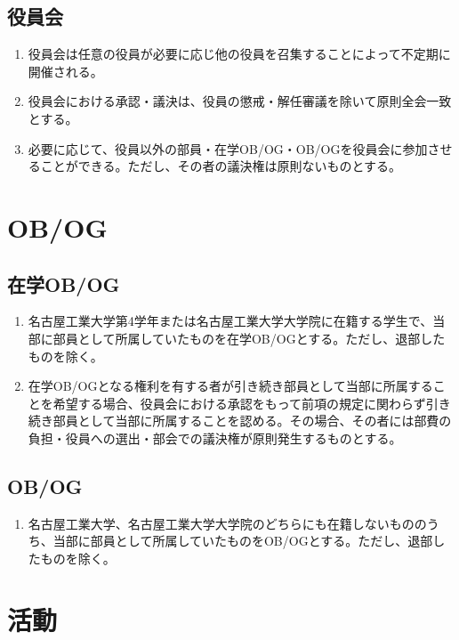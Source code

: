 \documentclass[12pt, unicode, a4paper]{ltjsreport}
\begin{document}
    \section{役員会}
        \begin{enumerate}
            \item 役員会は任意の役員が必要に応じ他の役員を召集することによって不定期に開催される。
            \item 役員会における承認・議決は、役員の懲戒・解任審議を除いて原則全会一致とする。
            \item 必要に応じて、役員以外の部員・在学OB/OG・OB/OGを役員会に参加させることができる。ただし、その者の議決権は原則ないものとする。
        \end{enumerate}


\chapter{OB/OG}
    \section{在学OB/OG}
        \begin{enumerate}
            \item 名古屋工業大学第4学年または名古屋工業大学大学院に在籍する学生で、当部に部員として所属していたものを在学OB/OGとする。ただし、退部したものを除く。
            \item 在学OB/OGとなる権利を有する者が引き続き部員として当部に所属することを希望する場合、役員会における承認をもって前項の規定に関わらず引き続き部員として当部に所属することを認める。その場合、その者には部費の負担・役員への選出・部会での議決権が原則発生するものとする。
        \end{enumerate}

    \section{OB/OG}
        \begin{enumerate}
            \item 名古屋工業大学、名古屋工業大学大学院のどちらにも在籍しないもののうち、当部に部員として所属していたものをOB/OGとする。ただし、退部したものを除く。
        \end{enumerate}


\chapter{活動}
\end{document}
